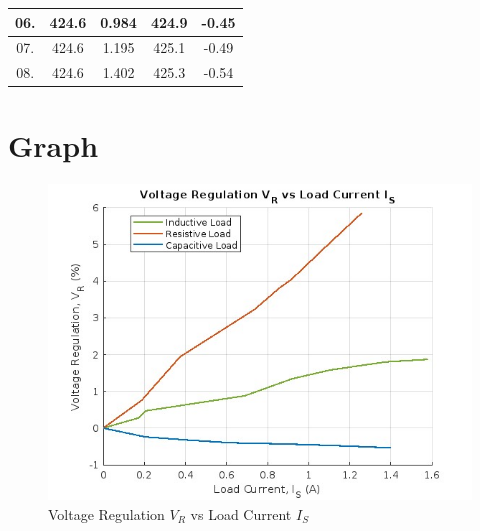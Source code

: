 \documentclass[a4paper,12pt]{article}
\begin{document}
\begin{table}[H]
\begin{tabular}{|c|c|c|c|c|}
			06.              & 424.6                                                                     & 0.984                                                              & 424.9                                                                  & -0.45                                                                \\ \hline
			07.              & 424.6                                                                     & 1.195                                                              & 425.1                                                                  & -0.49                                                                \\ \hline
			08.              & 424.6                                                                     & 1.402                                                              & 425.3                                                                  & -0.54                                                                \\ \hline
		\end{tabular}
	\end{table}
	
	\section{Graph}
	
	\begin{figure}[H]
		\centering
		\includegraphics[width=1\linewidth]{Images/exp9}
		\caption{Voltage Regulation $V_R$ vs Load Current $I_S$}
		\label{fig:st}
	\end{figure}
\end{document}
